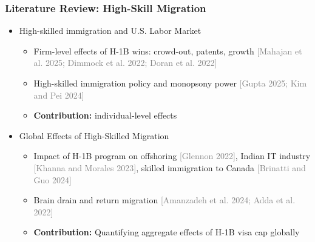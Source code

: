 \documentclass[xcolor=dvipsnames, compress, 12pt, aspectratio=169, handout]{beamer}
\begin{document}
\begin{frame}
    \frametitle{Literature Review: High-Skill Migration}
    \begin{itemize}
        \item High-skilled immigration and U.S. Labor Market  
        \begin{itemize}
            \item Firm-level effects of H-1B wins: crowd-out, patents, growth \textcolor{gray}{\footnotesize [Mahajan et al. 2025; Dimmock et al. 2022; Doran et al. 2022]}
            \item High-skilled immigration policy and monopsony power \textcolor{gray}{\footnotesize [Gupta 2025; Kim and Pei 2024]}
            \item \textbf{Contribution:} individual-level effects 
        \end{itemize}
        \vspace{4mm}
        \item Global Effects of High-Skilled Migration
        \begin{itemize}
            \item Impact of H-1B program on offshoring \textcolor{gray}{\footnotesize [Glennon 2022]}, Indian IT industry \textcolor{gray}{\footnotesize [Khanna and Morales 2023]}, skilled immigration to Canada \textcolor{gray}{\footnotesize [Brinatti and Guo 2024]}
            \item Brain drain and return migration \textcolor{gray}{\footnotesize [Amanzadeh et al. 2024; Adda et al. 2022]}
            \item \textbf{Contribution:} Quantifying aggregate effects of H-1B visa cap globally
        \end{itemize}
    \end{itemize}
\end{frame}
\end{document}
